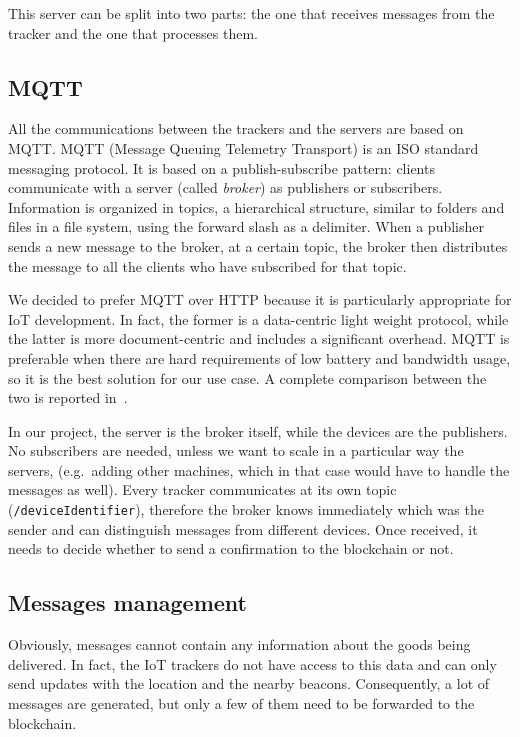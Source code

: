 This server can be split into two parts: the one that receives messages from the tracker and the one that processes them.

\subsection{MQTT}
\label{sec:mqtt}
All the communications between the trackers and the servers are based on MQTT. MQTT (Message Queuing Telemetry Transport) is an ISO standard messaging protocol. It is based on a publish-subscribe pattern: clients communicate with a server (called \emph{broker}) as publishers or subscribers. Information is organized in topics, a hierarchical structure, similar to folders and files in a file system, using the forward slash as a delimiter. When a publisher sends a new message to the broker, at a certain topic, the broker then distributes the message to all the clients who have subscribed for that topic.

We decided to prefer MQTT over HTTP because it is particularly appropriate for IoT development. In fact, the former is a data-centric light weight protocol, while the latter is more document-centric and includes a significant overhead. MQTT is preferable when there are hard requirements of low battery and bandwidth usage, so it is the best solution for our use case. A complete comparison between the two is reported in~\cite{httpVSmqtt}.

In our project, the server is the broker itself, while the devices are the publishers. No subscribers are needed, unless we want to scale in a particular way the servers, (e.g.\ adding other machines, which in that case would have to handle the messages as well). Every tracker communicates at its own topic (\texttt{/deviceIdentifier}), therefore the broker knows immediately which was the sender and can distinguish messages from different devices. Once received, it needs to decide whether to send a confirmation to the blockchain or not.

\subsection{Messages management}
Obviously, messages cannot contain any information about the goods being delivered. In fact, the IoT trackers do not have access to this data and can only send updates with the location and the nearby beacons. Consequently, a lot of messages are generated, but only a few of them need to be forwarded to the blockchain.

